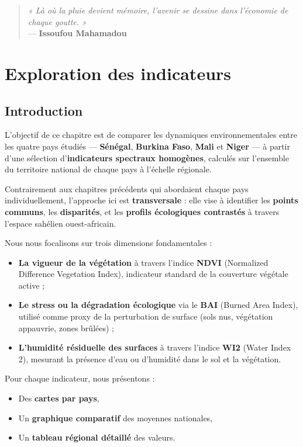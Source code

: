 \documentclass[
]{book}
\providecommand{\tightlist}{%
  \setlength{\itemsep}{0pt}\setlength{\parskip}{0pt}}
\begin{document}
\begin{quote}
\emph{« Là où la pluie devient mémoire, l'avenir se dessine dans l'économie de chaque goutte. »}\\
--- \textbf{Issoufou Mahamadou}
\end{quote}

\chapter{Exploration des indicateurs}\label{exploration-des-indicateurs}

\section{Introduction}\label{introduction-4}

L'objectif de ce chapitre est de comparer les dynamiques environnementales entre les quatre pays étudiés --- \textbf{Sénégal}, \textbf{Burkina Faso}, \textbf{Mali} et \textbf{Niger} --- à partir d'une sélection d'\textbf{indicateurs spectraux homogènes}, calculés sur l'ensemble du territoire national de chaque pays à l'échelle régionale.

Contrairement aux chapitres précédents qui abordaient chaque pays individuellement, l'approche ici est \textbf{transversale} : elle vise à identifier les \textbf{points communs}, les \textbf{disparités}, et les \textbf{profils écologiques contrastés} à travers l'espace sahélien ouest-africain.

Nous nous focalisons sur trois dimensions fondamentales :

\begin{itemize}
\tightlist
\item
  \textbf{La vigueur de la végétation} à travers l'indice \textbf{NDVI} (Normalized Difference Vegetation Index), indicateur standard de la couverture végétale active ;
\item
  \textbf{Le stress ou la dégradation écologique} via le \textbf{BAI} (Burned Area Index), utilisé comme proxy de la perturbation de surface (sols nus, végétation appauvrie, zones brûlées) ;
\item
  \textbf{L'humidité résiduelle des surfaces} à travers l'indice \textbf{WI2} (Water Index 2), mesurant la présence d'eau ou d'humidité dans le sol et la végétation.
\end{itemize}

Pour chaque indicateur, nous présentons :

\begin{itemize}
\tightlist
\item
  Des \textbf{cartes par pays},
\item
  Un \textbf{graphique comparatif} des moyennes nationales,
\item
  Un \textbf{tableau régional détaillé} des valeurs.
\end{itemize}
\end{document}
